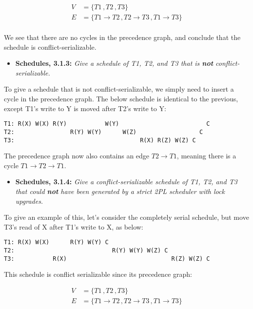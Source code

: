 \begin{align*}
  V &= \{T1\, , T2\, , T3\}\\
  E &= \{T1 \to T2\, , T2 \to T3\, , T1 \to T3\}\\
\end{align*}

We see that there are no cycles in the precedence graph, and conclude that the
schedule is conflict-serializable.


\begin{itemize}
  \item \textbf{Schedules, 3.1.3:}
    \textit{Give a schedule of T1, T2, and T3 that is \textbf{not}
    conflict-serializable.}
\end{itemize}

To give a schedule that is not conflict-serializable, we simply need to insert a
cycle in the precedence graph. The below schedule is identical to the previous,
except T1's write to Y is moved after T2's write to Y:

\begin{verbatim}
T1: R(X) W(X) R(Y)           W(Y)                         C
T2:                R(Y) W(Y)      W(Z)                  C
T3:                                    R(X) R(Z) W(Z) C
\end{verbatim}

The precedence graph now also contains an edge $T2 \to T1$, meaning there is a
cycle $T1 \to T2 \to T1$.

\begin{itemize}
  \item \textbf{Schedules, 3.1.4:}
    \textit{Give a conflict-serializable schedule of T1, T2, and T3 that could
    \textbf{not} have been generated by a strict 2PL scheduler with lock
  upgrades.}
\end{itemize}

To give an example of this, let's consider the completely serial schedule, but
move T3's read of X after T1's write to X, as below:

\begin{verbatim}
T1: R(X) W(X)      R(Y) W(Y) C
T2:                            R(Y) W(Y) W(Z) C
T3:           R(X)                              R(Z) W(Z) C
\end{verbatim}

This schedule is conflict serializable since its precedence graph:

\begin{align*}
  V &= \{T1\, , T2\, , T3\}\\
  E &= \{T1 \to T2\, , T2 \to T3\, , T1 \to T3\}\\
\end{align*}

